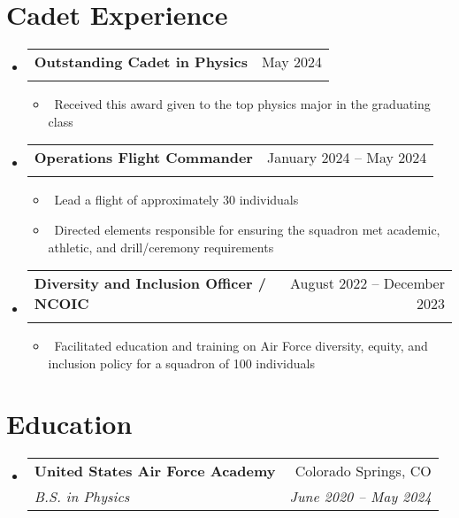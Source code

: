 \documentclass[letterpaper,10pt]{article}
\makeatletter
\newcommand{\resumeItem}[1]{\item\small{#1}}
\newcommand{\resumeSubheading}[4]{
\vspace{-1pt}\item
  \begin{tabular*}{0.97\textwidth}[t]{l@{\extracolsep{\fill}}r}
    \textbf{#1} & #2 \\
    \textit{#3} & \textit{#4} \\
  \end{tabular*}\vspace{-7pt}
}
\newcommand{\resumeSubHeadingList}{\begin{itemize}[leftmargin=0.15in, label={}]}
\newcommand{\resumeSubHeadingListEnd}{\end{itemize}}
\makeatother
\begin{document}
\section{Cadet Experience}
\resumeSubHeadingList
	\resumeSubheading{Outstanding Cadet in Physics}{May 2024}{}{}
	\resumeSubHeadingList
		\resumeItem{\textbullet\ Received this award given to the top physics major in the graduating class}
	\resumeSubHeadingListEnd
	\resumeSubheading{Operations Flight Commander}{January 2024 -- May 2024}{}{}
	\resumeSubHeadingList
		\resumeItem{\textbullet\ Lead a flight of approximately 30 individuals} 
		\resumeItem{\textbullet\ Directed elements responsible for ensuring the squadron met academic, athletic, and drill/ceremony requirements}
	\resumeSubHeadingListEnd
	\resumeSubheading{Diversity and Inclusion Officer / NCOIC}{August 2022 -- December 2023}{}{}
	\resumeSubHeadingList
		\resumeItem{\textbullet\ Facilitated education and training on Air Force diversity, equity, and inclusion policy for a squadron of 100 individuals}
	\resumeSubHeadingListEnd
\resumeSubHeadingListEnd

\section{Education}
\resumeSubHeadingList
  \resumeSubheading
      {United States Air Force Academy}{Colorado Springs, CO}
      {B.S. in Physics}{June 2020 -- May 2024}
\resumeSubHeadingListEnd
\end{document}
